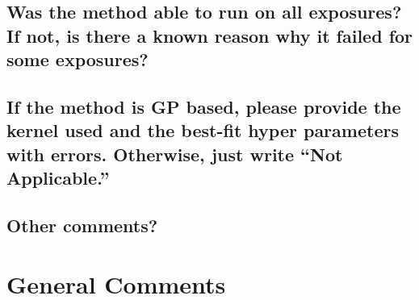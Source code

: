 \documentclass[12pt]{article}
\begin{document}
\subsection{Was the method able to run on all exposures?  If not, is there a known reason why it failed for some exposures?}


\subsection{If the method is GP based, please provide the kernel used and the best-fit hyper parameters with errors.  Otherwise, just write ``Not Applicable.''}


\subsection{Other comments?}


\section{General Comments}
\end{document}
